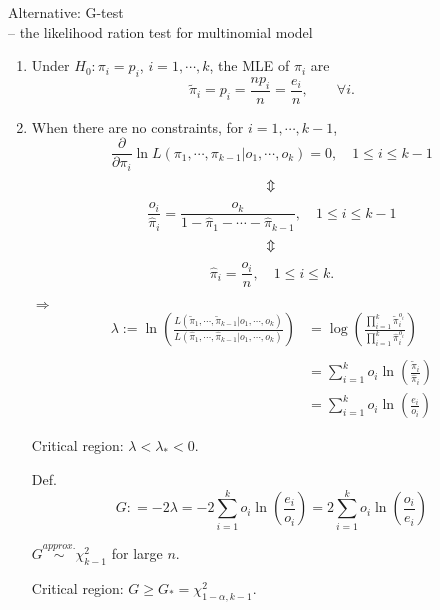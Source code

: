 \begin{frame}[fragile]{Alternative: G-test\\
	\small -- the likelihood ration test for multinomial model}

	\begin{enumerate}
		\item Under $H_0:\pi_i=p_i$, $i=1,\cdots,k$, the MLE of $\pi_i$ are
			\[
				\widetilde\pi_i = p_i =  \frac{np_i}{n} =  \frac{e_i}{n},\qquad \forall i.
			\]
			\vfill
		\item When there are no constraints, for $i=1,\cdots,k-1$,
			\[
				\frac{\partial}{\partial \pi_i} \ln L(\pi_1,\cdots,\pi_{k-1}|o_1,\cdots,o_k)  = 0  ,\quad 1\le i\le k-1
			\]
			\[\text{\rotatebox[origin=c]{90}{$\Leftrightarrow$}}\]
			\[
				\frac{o_i}{\widehat\pi_i} = \frac{o_k}{1-\widehat\pi_1-\cdots - \widehat\pi_{k-1}},\quad 1\le i\le k-1
			\]
			\[\text{\rotatebox[origin=c]{90}{$\Leftrightarrow$}}\]
			\[
				\widehat\pi_i = \frac{o_i}{n},\quad 1\le i\le k.
			\]
	\end{enumerate}
\end{frame}
\begin{frame}[fragile]

	\begin{enumerate}
		\setcounter{enumi}{3}
	\item[$\Rightarrow$]
		\begin{align*}
			\lambda := \ln \left( \frac{L(\widetilde\pi_1,\cdots,\widetilde\pi_{k-1}|o_1,\cdots,o_k)}{L(\widehat\pi_1,\cdots,\widehat\pi_{k-1}|o_1,\cdots,o_k)} \right)
			&= \log \left( \frac{\prod_{i=1}^k \widetilde{\pi}_i^{o_i}}{\prod_{i=1}^k \widehat{\pi}_i^{o_i}}\right)\\
			\\&=\sum_{i=1}^k o_i \ln \left(  \frac{\widetilde\pi_i}{\widehat\pi_i}\right )
			\\&=\sum_{i=1}^k o_i \ln \left(  \frac{e_i}{o_i}\right )
		\end{align*}
	\item[] Critical region: $\lambda<\lambda_*<0$.
		\vfill
	\item[Def.]
		\[
			G: = -2 \lambda = -2\sum_{i=1}^k o_i \ln \left(  \frac{e_i}{o_i}\right )
=2\sum_{i=1}^k o_i \ln \left(  \frac{o_i}{e_i}\right )
		\]
	\item[] $G \stackrel{approx.}{\sim} \chi^2_{k-1}$ for large $n$.
	\item[] Critical region: $G\ge G_* = \chi^2_{1-\alpha,k-1}$.
\end{enumerate}
\end{frame}
